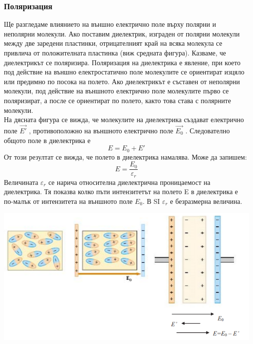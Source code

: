 \documentclass[fleqn, 12pt]{article}
\theoremstyle{definition}
\begin{document}
\subsubsection{Поляризация}
Ще разгледаме влиянието на външно електрично поле върху полярни и
неполярни молекули. Ако поставим диелектрик, изграден от полярни молекули между
две заредени пластинки, отрицателният край на всяка молекула се привлича от
положителната пластинка (виж средната фигура). Казваме, че диелектрикът се
поляризира. Поляризация на диелектрика е явление, при което под действие на външно
електростатично поле молекулите се ориентират изцяло или предимно по посока на
полето. Ако диелектрикът е съставен от неполярни молекули, под действие на
външното електрично поле молекулите първо се поляризират, а после се ориентират по
полето, както това става с полярните молекули. \\
На дясната фигура се вижда, че молекулите на диелектрика създават електрично
поле $\vec{E'}$ , противоположно на външното електрично поле $\vec{E_0}$ . Следователно общото
поле в диелектрика е 
$$E = E_0 + E'$$
От този резултат се вижда, че полето в диелектрика намалява. Може да запишем: 
$$E = \frac{E_0}{\varepsilon_r}$$
Величината $\varepsilon_r$ се нарича относителна диелектрична проницаемост на
диелектрика. Тя показва колко пъти интензитетът на полето E в диелектрика е по-малък
от интензитета на външното поле $E_0$. В SI $\varepsilon_r$ е безразмерна величина. 
\begin{center}
  \includegraphics{Pics/physics/lec6-9-2.png}
\end{center}
\end{document}
